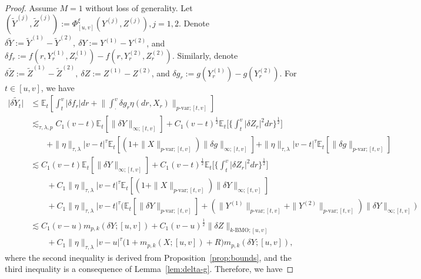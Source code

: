 \documentclass[11pt,reqno]{amsart}
\numberwithin{equation}{section}
\begin{document}
\begin{proof}
Assume $M=1$ without loss of generality. Let $(\tilde{Y}^{(j)},\tilde{Z}^{(j)}) := \Phi^{\xi}_{[u,v]}(Y^{(j)},Z^{(j)}), j=1, 2.$ Denote $\delta\tilde{Y} := \tilde{Y}^{(1)}-\tilde{Y}^{(2)},\ \delta  Y := Y^{(1)}-Y^{(2)}$, and $\delta f_{r} := f(r,Y^{(1)}_{r},Z^{(1)}_{r}) - f(r,Y^{(2)}_{r},Z^{(2)}_{r})$. Similarly, denote $\delta \tilde{Z}:= \tilde{Z}^{(1)}-\tilde{Z}^{(2)},\ \delta Z := Z^{(1)}-Z^{(2)}$, and $\delta g_{r}:= g(Y^{(1)}_{r}) - g(Y^{(2)}_{r}).$ For $t\in[u,v]$, we have
\begin{equation*}
\begin{aligned}
\Big|\delta \tilde{Y}_{t}\Big| 
&\le \mathbb{E}_{t}\left[\int_{t}^{v}|\delta f_{r}|dr + \Big\|\int_{\cdot}^{v} \delta g_{r} \eta(dr,X_{r})\Big\|_{p\text{-var};[t,v]}\right]\\
&\lesssim_{\tau,\lambda,p} C_{1}(v-t)\mathbb{E}_{t}\left[\|\delta Y\|_{\infty;[t,v]}\right] + C_{1}(v-t)^{\frac{1}{2}}\mathbb{E}_{t}\Big[\Big\{\int_{t}^{v}|\delta Z_{r}|^{2}dr \Big\}^{\frac{1}{2}}\Big]\\
&\quad\quad+ \|\eta\|_{\tau,\lambda}|v - t|^{\tau} \mathbb{E}_{t}\left[\left(1+\|X\|_{p\text{-var};[t,v]}\right)\|\delta g\|_{\infty;[t,v]}\right] + \|\eta\|_{\tau,\lambda}|v - t|^{\tau}\mathbb{E}_{t}\left[\|\delta g\|_{p\text{-var};[t,v]}\right]\\
&\lesssim C_{1}(v-t)\mathbb{E}_{t}\left[\|\delta Y\|_{\infty;[t,v]}\right] + C_{1}(v-t)^{\frac{1}{2}}\mathbb{E}_{t}\Big[\Big\{\int_{t}^{v}|\delta Z_{r}|^{2}dr \Big\}^{\frac{1}{2}}\Big]\\
&\quad\quad + C_{1}\|\eta\|_{\tau,\lambda}|v - t|^{\tau} \mathbb{E}_{t}\left[\left(1+\|X\|_{p\text{-var};[t,v]}\right)\|\delta Y\|_{\infty;[t,v]}\right] \\
&\quad\quad + C_{1}\|\eta\|_{\tau,\lambda}|v - t|^{\tau}\Big(\mathbb{E}_{t}\left[\|\delta Y\|_{p\text{-var};[t,v]}\right] + (\|Y^{(1)}\|_{p\text{-var};[t,v]} + \|Y^{(2)}\|_{p\text{-var};[t,v]})\|\delta Y\|_{\infty;[t,v]}\Big)\\
&\lesssim C_{1}(v-u)m_{p,k}(\delta Y;[u,v]) + C_{1}(v-u)^{\frac{1}{2}}\|\delta Z\|_{k\text{-BMO};[u,v]} \\
&\quad\quad + C_{1}\|\eta\|_{\tau,\lambda}|v-u|^{\tau}\big(1+m_{p,k}(X;[u,v]) + R\big)m_{p,k}(\delta Y;[u,v]),
\end{aligned}
\end{equation*}
where the second inequality is derived from Proposition~\ref{prop:bounds}, and the third inequality is a consequence of Lemma~\ref{lem:delta-g}. Therefore, we have

\end{proof}
\end{document}
